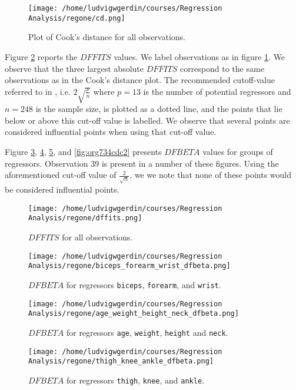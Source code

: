 \documentclass[11pt]{article}
\begin{document}
\begin{figure}[h]
\centering
\texttt{[image: /home/ludvigwgerdin/courses/Regression Analysis/regone/cd.png]}
\caption{\label{fig:orgdb7ed08}
Plot of Cook's distance for all observations.}
\end{figure}

Figure \ref{fig:org69597f5} reports the \(DFFITS\) values. We label observations as in figure \ref{fig:orgdb7ed08}. We observe 
that the three largest absolute \(DFFITS\) correspond to the same observations as in the Cook's distance plot.
The recommended cutoff-value referred to in \cite{Montgomery2012}, i.e. \(2\sqrt{\frac{p}{n}}\)
where \(p = 13\) is the number of potential regressors and \(n = 248\) is the sample size, is 
plotted as a dotted line, and the points that lie below or above this cut-off value is labelled.
We observe that several points are considered influential points when using that cut-off value.

Figure \ref{fig:org00f6d0e}, \ref{fig:org4c2a880}, \ref{fig:orgc73ecec}, and
\ref{fig:org734cdc2} presents \(DFBETA\) values for groups of regressors. Observation 39
is present in a number of these figures. Using the aforementioned cut-off value of \(\frac{2}{\sqrt{n}}\), we 
we note that none of these points would be considered influential points.
\begin{figure}[h]
\centering
\texttt{[image: /home/ludvigwgerdin/courses/Regression Analysis/regone/dffits.png]}
\caption{\label{fig:org69597f5}
\(DFFITS\) for all observations.}
\end{figure}

\begin{figure}[h]
\centering
\texttt{[image: /home/ludvigwgerdin/courses/Regression Analysis/regone/biceps\_forearm\_wrist\_dfbeta.png]}
\caption{\label{fig:org00f6d0e}
\(DFBETA\) for regressors \texttt{biceps}, \texttt{forearm}, and \texttt{wrist}.}
\end{figure}

\begin{figure}[h]
\centering
\texttt{[image: /home/ludvigwgerdin/courses/Regression Analysis/regone/age\_weight\_height\_neck\_dfbeta.png]}
\caption{\label{fig:org4c2a880}
\(DFBETA\) for regressors \texttt{age}, \texttt{weight}, \texttt{height} and \texttt{neck}.}
\end{figure}

\begin{figure}[h]
\centering
\texttt{[image: /home/ludvigwgerdin/courses/Regression Analysis/regone/thigh\_knee\_ankle\_dfbeta.png]}
\caption{\label{fig:orgc73ecec}
\(DFBETA\) for regressors \texttt{thigh}, \texttt{knee}, and \texttt{ankle}.}
\end{figure}
\end{document}
